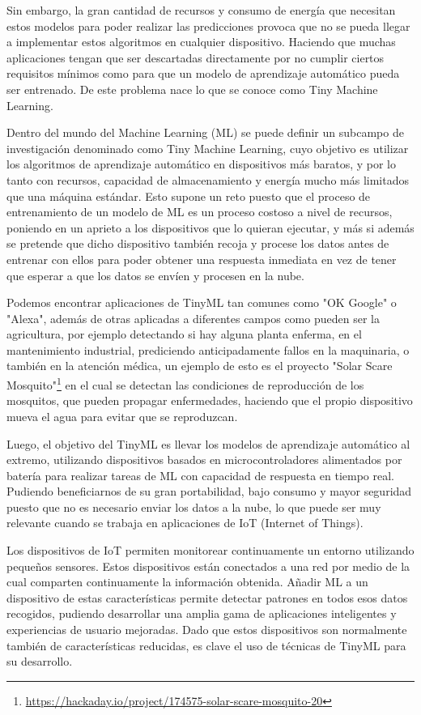 \documentclass[a4paper, 12pt]{book}
\begin{document}
Sin embargo, la gran cantidad de recursos y consumo de energía que necesitan estos modelos para poder realizar las predicciones provoca que no se pueda llegar a implementar estos algoritmos en cualquier dispositivo. Haciendo que muchas aplicaciones tengan que ser descartadas directamente por no cumplir ciertos requisitos mínimos como para que un modelo de aprendizaje automático pueda ser entrenado. De este problema nace lo que se conoce como Tiny Machine Learning.

Dentro del mundo del Machine Learning (ML) se puede definir un subcampo de investigación denominado como Tiny Machine Learning, cuyo objetivo es utilizar los algoritmos de aprendizaje automático en dispositivos más baratos, y por lo tanto con recursos, capacidad de almacenamiento y energía mucho más limitados que una máquina estándar. Esto supone un reto puesto que el proceso de entrenamiento de un modelo de ML es un proceso costoso a nivel de recursos, poniendo en un aprieto a los dispositivos que lo quieran ejecutar, y más si además se pretende que dicho dispositivo también recoja y procese los datos antes de entrenar con ellos para poder obtener una respuesta inmediata en vez de tener que esperar a que los datos se envíen y procesen en la nube.

Podemos encontrar aplicaciones de TinyML tan comunes como "OK Google" o "Alexa", además de otras aplicadas a diferentes campos como pueden ser la agricultura, por ejemplo detectando si hay alguna planta enferma, en el mantenimiento industrial, prediciendo anticipadamente fallos en la maquinaria, o también en la atención médica, un ejemplo de esto es el proyecto "Solar Scare Mosquito"\footnote{\url{https://hackaday.io/project/174575-solar-scare-mosquito-20}} en el cual se detectan las condiciones de reproducción de los mosquitos, que pueden propagar enfermedades, haciendo que el propio dispositivo mueva el agua para evitar que se reproduzcan.

Luego, el objetivo del TinyML es llevar los modelos de aprendizaje automático al extremo, utilizando dispositivos basados en microcontroladores alimentados por batería para realizar tareas de ML con capacidad de respuesta en tiempo real. Pudiendo beneficiarnos de su gran portabilidad, bajo consumo y mayor seguridad puesto que no es necesario enviar los datos a la nube, lo que puede ser muy relevante cuando se trabaja en aplicaciones de IoT (Internet of Things).

Los dispositivos de IoT permiten monitorear continuamente un entorno utilizando pequeños sensores. Estos dispositivos están conectados a una red por medio de la cual comparten continuamente la información obtenida. Añadir ML a un dispositivo de estas características permite detectar patrones en todos esos datos recogidos, pudiendo desarrollar una amplia gama de aplicaciones inteligentes y experiencias de usuario mejoradas. Dado que estos dispositivos son normalmente también de características reducidas, es clave el uso de técnicas de TinyML para su desarrollo.
\end{document}
